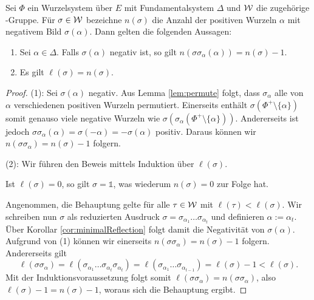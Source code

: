 \begin{lem}
  \label{lem:lengthAndNegativeRoots}
  Sei $\Phi$ ein Wurzelsystem über $E$ mit Fundamentalsystem $\Delta$ und $\mathcal{W}$ die zugehörige \weyl\hyp{}Gruppe.
  Für $\sigma \in \mathcal{W}$ bezeichne $n(\sigma)$ die Anzahl der positiven Wurzeln $\alpha$ mit negativem Bild $\sigma(\alpha)$.
  Dann gelten die folgenden Aussagen:
  \begin{enumerate}[(1)]
    \item Sei $\alpha \in \Delta$. Falls $\sigma(\alpha)$ negativ ist, so gilt $n(\sigma\sigma_\alpha(\alpha)) = n(\sigma) - 1$.
    \item Es gilt $\ell(\sigma) = n(\sigma)$.
  \end{enumerate}
\end{lem}

\begin{proof}
  (1):
  Sei $\sigma(\alpha)$ negativ.
  Aus Lemma \ref{lem:permute} folgt, dass $\sigma_\alpha$ alle von $\alpha$ verschiedenen positiven Wurzeln permutiert.
  Einerseits enthält $\sigma(\Phi^+ \setminus \{\alpha\})$ somit genauso viele negative Wurzeln wie $\sigma(\sigma_\alpha(\Phi^+ \setminus \{\alpha\}))$.
  Andererseits ist jedoch 
  $\sigma \sigma_\alpha (\alpha) = \sigma(-\alpha) = -\sigma(\alpha)$ 
  positiv.
  Daraus können wir $n(\sigma\sigma_\alpha) = n(\sigma) - 1$ folgern.

  (2):
  Wir führen den Beweis mittels Induktion über $\ell(\sigma)$.

  Ist $\ell(\sigma)=0$, so gilt $\sigma = \mathds{1}$, was wiederum $n(\sigma)=0$ zur Folge hat.

  Angenommen, die Behauptung gelte für alle $\tau \in \mathcal{W}$ mit $\ell(\tau) < \ell(\sigma)$.
  Wir schreiben nun $\sigma$ als reduzierten Ausdruck $\sigma = \sigma_{\alpha_1} \dots \sigma_{\alpha_t}$ und definieren $\alpha := \alpha_t$.
  Über Korollar \ref{cor:minimalReflection} folgt damit die Negativität von $\sigma(\alpha)$.
  Aufgrund von (1) können wir einerseits $n(\sigma\sigma_\alpha) = n(\sigma) - 1$ folgern.
  Andererseits gilt 
  \begin{displaymath}
  \ell(\sigma\sigma_\alpha) 
  = \ell(\sigma_{\alpha_1} \dots \sigma_{\alpha_{t}} \sigma_{\alpha_t}) 
  = \ell(\sigma_{\alpha_1} \dots \sigma_{\alpha_{t -1}}) 
  = \ell(\sigma) - 1 < \ell(\sigma).
  \end{displaymath}
  Mit der Induktions\-voraussetzung folgt somit $\ell(\sigma\sigma_\alpha) = n(\sigma\sigma_\alpha)$, also $\ell(\sigma) - 1 = n(\sigma) - 1$, woraus sich die Behauptung ergibt.
\end{proof}

